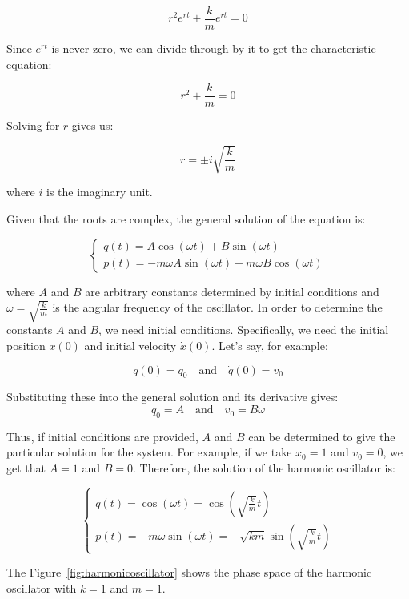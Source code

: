 \documentclass{report}
\begin{document}
\[
	r^2 e^{rt} + \frac{k}{m} e^{rt} = 0
\]

Since \( e^{rt} \) is never zero, we can divide through by it to get the characteristic equation:

\[
	r^2 + \frac{k}{m} = 0
\]

Solving for \( r \) gives us:

\[
	r = \pm i \sqrt{\frac{k}{m}}
\]

where \( i \) is the imaginary unit.

Given that the roots are complex, the general solution of the equation is:

\[
	\begin{cases}
		q(t) = A \cos(\omega t) + B \sin(\omega t) \\
		p(t) = -m \omega A \sin(\omega t) + m \omega B \cos(\omega t)
	\end{cases}
\]

where \( A \) and \( B \) are arbitrary constants determined by initial conditions and \( \omega = \sqrt{\frac{k}{m}} \) is the angular frequency of the oscillator. In order to determine the constants \( A \) and \( B \), we need initial conditions. Specifically, we need the initial position \( x(0) \) and initial velocity \( \dot{x}(0) \). Let's say, for example:

\[
q(0) = q_0 \quad \text{and} \quad \dot{q}(0) = v_0
\]

Substituting these into the general solution and its derivative gives:
\[
q_0 = A \quad \text{and} \quad v_0 = B \omega
\]

Thus, if initial conditions are provided, \( A \) and \( B \) can be determined to give the particular solution for the system. For example, if we take \(x_0 = 1\) and \(v_0 = 0\), we get that \(A = 1\) and \(B = 0\). Therefore, the solution of the harmonic oscillator is:

\[
	\begin{cases}
		q(t) = \cos(\omega t) = \cos(\sqrt{\frac{k}{m}} t) \\
		p(t) = -m \omega \sin(\omega t) = -\sqrt{km} \sin(\sqrt{\frac{k}{m}} t)
	\end{cases}
\]

The Figure~\ref{fig:harmonicoscillator} shows the phase space of the harmonic oscillator with \(k = 1\) and \(m = 1\).
\end{document}
